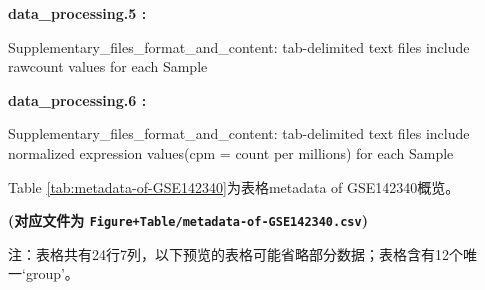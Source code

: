 \documentclass[
]{article}
\begin{document}
\begin{center}
\begin{tcolorbox}[colback=gray!10, colframe=gray!50, width=0.9\linewidth, arc=1mm, boxrule=0.5pt]
\textbf{
data\_processing.5
:}

\vspace{0.5em}

    Supplementary\_files\_format\_and\_content: tab-delimited
text files include rawcount values for each Sample

\vspace{2em}


\textbf{
data\_processing.6
:}

\vspace{0.5em}

    Supplementary\_files\_format\_and\_content: tab-delimited
text files include normalized expression values(cpm = count
per millions) for each Sample

\vspace{2em}
\end{tcolorbox}
\end{center}

Table \ref{tab:metadata-of-GSE142340}为表格metadata of GSE142340概览。

\textbf{(对应文件为 \texttt{Figure+Table/metadata-of-GSE142340.csv})}

\begin{center}\begin{tcolorbox}[colback=gray!10, colframe=gray!50, width=0.9\linewidth, arc=1mm, boxrule=0.5pt]注：表格共有24行7列，以下预览的表格可能省略部分数据；表格含有12个唯一`group'。
\end{tcolorbox}
\end{center}
\end{document}
